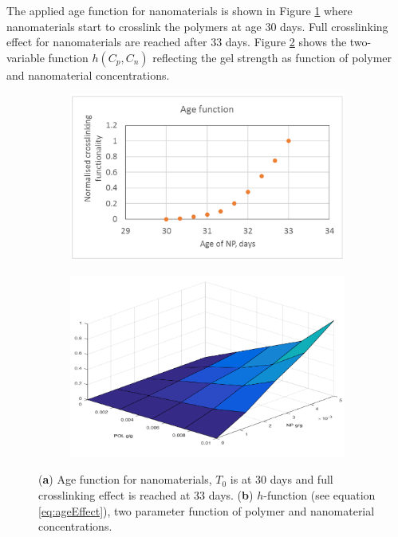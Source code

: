 \documentclass[nanomaterials,article,submit,moreauthors,pdftex]{Definitions/mdpi}
\begin{document}
The applied age function for nanomaterials is shown in Figure \ref{cht:ageFunc} where nanomaterials start to crosslink the polymers at age 30 days. Full crosslinking effect for nanomaterials are reached after 33 days. Figure \ref{cht:hFunc} shows the two-variable function $h(C_p,C_n)$  reflecting the gel strength as function of polymer and nanomaterial concentrations.      

\begin{figure}[h!] %
    \centering
    \begin{subfigure}[b]{.49\textwidth}
    \includegraphics[width=\textwidth]{fig/ageFunc.png}
    \caption{}
    \label{cht:ageFunc}
    \end{subfigure}
    \begin{subfigure}[b]{.49\textwidth}
    \includegraphics[width=\textwidth]{fig/hFunc.png}
    \caption{}
    \label{cht:hFunc}
    \end{subfigure}
    
    \caption{(\textbf{a}) Age function for nanomaterials, $T_0$ is at 30 days and full crosslinking effect is reached at 33 days. (\textbf{b}) $h$-function (see equation \ref{eq:ageEffect}), two parameter function of polymer and nanomaterial concentrations. }
    \label{cht:ageAndH}
\end{figure}
\end{document}

